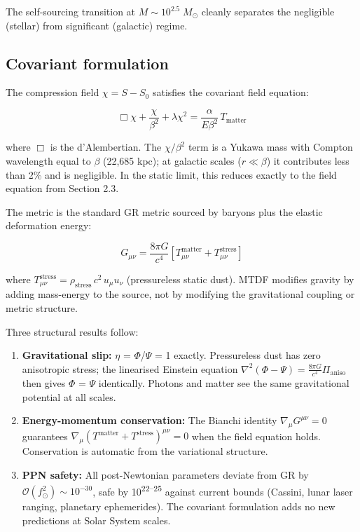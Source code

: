 \documentclass[11pt,a4paper]{article}
\begin{document}
The self-sourcing transition at \(M \sim 10^{2.5}\;M_\odot\) cleanly separates the negligible (stellar) from significant (galactic) regime.

\subsection{Covariant formulation}
The compression field \(\chi = S - S_0\) satisfies the covariant field equation:

\[ \Box\chi + \frac{\chi}{\beta^2} + \lambda\chi^2 = \frac{\alpha}{E\beta^2}\,T_{\mathrm{matter}} \]

where \(\Box\) is the d'Alembertian. The \(\chi/\beta^2\) term is a Yukawa mass with Compton wavelength equal to $\beta$ (22,685 kpc); at galactic scales (\(r \ll \beta\)) it contributes less than 2\% and is negligible. In the static limit, this reduces exactly to the field equation from Section 2.3.

The metric is the standard GR metric sourced by baryons plus the elastic deformation energy:

\[ G_{\mu\nu} = \frac{8\pi G}{c^4}\left[T^{\mathrm{matter}}_{\mu\nu} + T^{\mathrm{stress}}_{\mu\nu}\right] \]

where \(T^{\mathrm{stress}}_{\mu\nu} = \rho_{\mathrm{stress}}\,c^2\,u_\mu u_\nu\) (pressureless static dust). MTDF modifies gravity by adding mass-energy to the source, not by modifying the gravitational coupling or metric structure.

Three structural results follow:

\begin{enumerate}
  \item \textbf{Gravitational slip:} $\eta$ = $\Phi$/$\Psi$ = 1 exactly. Pressureless dust has zero anisotropic stress; the linearised Einstein equation \(\nabla^2(\Phi - \Psi) = \frac{8\pi G}{c^4}\Pi_{\mathrm{aniso}}\) then gives $\Phi$ = $\Psi$ identically. Photons and matter see the same gravitational potential at all scales.
  \item \textbf{Energy-momentum conservation:} The Bianchi identity \(\nabla_\mu G^{\mu\nu} = 0\) guarantees \(\nabla_\mu(T^{\mathrm{matter}} + T^{\mathrm{stress}})^{\mu\nu} = 0\) when the field equation holds. Conservation is automatic from the variational structure.
  \item \textbf{PPN safety:} All post-Newtonian parameters deviate from GR by \(\mathcal{O}(f_\odot^2) \sim 10^{-30}\), safe by 10\textsuperscript{22--25} against current bounds (Cassini, lunar laser ranging, planetary ephemerides). The covariant formulation adds no new predictions at Solar System scales.
\end{enumerate}
\end{document}
